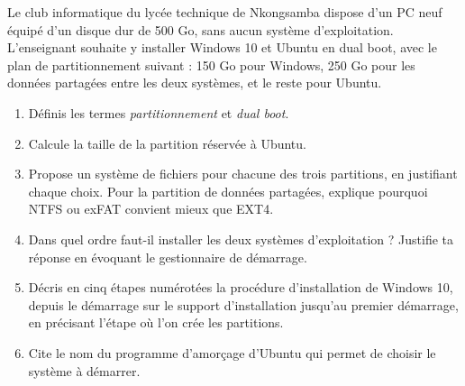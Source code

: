 \documentclass[11pt]{article}
\begin{document}
\begin{exercice}
Le club informatique du lycée technique de Nkongsamba dispose d'un PC neuf équipé d'un disque dur de 500 Go, sans aucun système d'exploitation. L'enseignant souhaite y installer Windows 10 et Ubuntu en dual boot, avec le plan de partitionnement suivant : 150 Go pour Windows, 250 Go pour les données partagées entre les deux systèmes, et le reste pour Ubuntu.
\begin{enumerate}
  \item Définis les termes \emph{partitionnement} et \emph{dual boot}.
  \item Calcule la taille de la partition réservée à Ubuntu.
  \item Propose un système de fichiers pour chacune des trois partitions, en justifiant chaque choix. Pour la partition de données partagées, explique pourquoi NTFS ou exFAT convient mieux que EXT4.
  \item Dans quel ordre faut-il installer les deux systèmes d'exploitation ? Justifie ta réponse en évoquant le gestionnaire de démarrage.
  \item Décris en cinq étapes numérotées la procédure d'installation de Windows 10, depuis le démarrage sur le support d'installation jusqu'au premier démarrage, en précisant l'étape où l'on crée les partitions.
  \item Cite le nom du programme d'amorçage d'Ubuntu qui permet de choisir le système à démarrer.
\end{enumerate}
\end{exercice}
\end{document}
